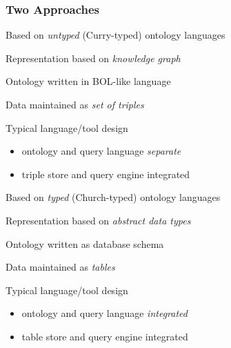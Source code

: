 \begin{frame}\frametitle{Two Approaches}
\begin{blockitems}{Based on \emph{untyped} (Curry-typed) ontology languages}
\item Representation based on \emph{knowledge graph}
\item Ontology written in BOL-like language
\item Data maintained as \emph{set of triples}
\item Typical language/tool design
 \begin{itemize}
 \item ontology and query language \emph{separate}
 \item triple store and query engine integrated
 \end{itemize}
\end{blockitems}

\begin{blockitems}{Based on \emph{typed} (Church-typed) ontology languages}
\item Representation based on \emph{abstract data types}
\item Ontology written as database schema
\item Data maintained as \emph{tables}
\item Typical language/tool design
 \begin{itemize}
 \item ontology and query language \emph{integrated}
 \item table store and query engine integrated
 \end{itemize}
\end{blockitems}
\end{frame}

